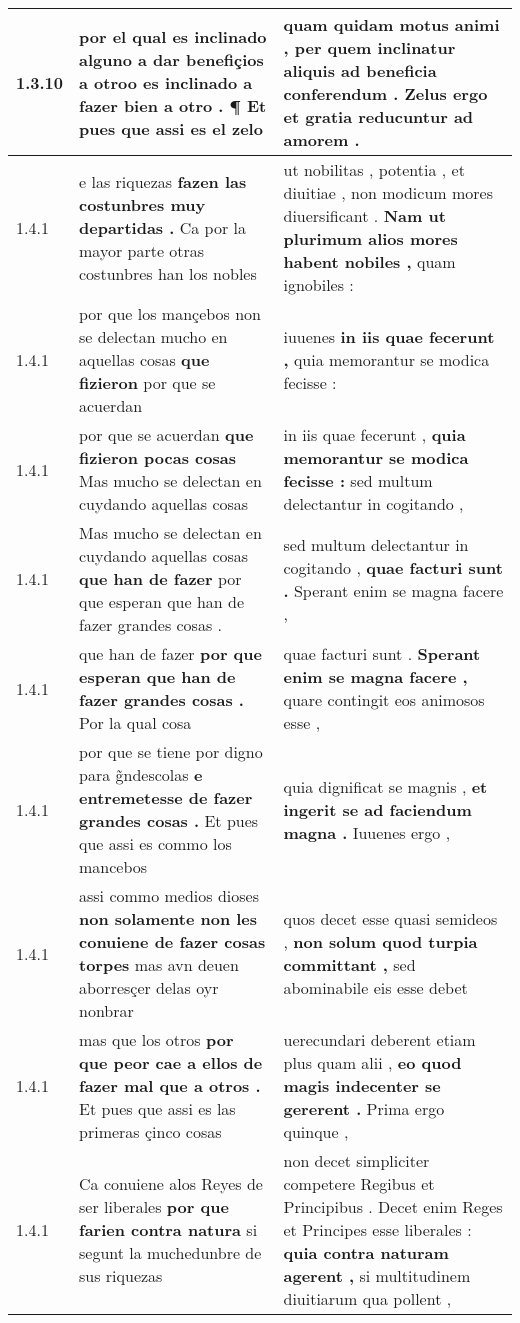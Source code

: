 \begin{tabular}{|p{1cm}|p{6.5cm}|p{6.5cm}|}
1.3.10 & por el qual es inclinado alguno a dar benefiçios a \textbf{ otroo es inclinado a fazer bien a otro . } ¶ Et pues que assi es el zelo & quam quidam motus animi , \textbf{ per quem inclinatur aliquis ad beneficia conferendum . } Zelus ergo et gratia reducuntur ad amorem . \\\hline
1.4.1 & e las riquezas \textbf{ fazen las costunbres muy departidas . } Ca por la mayor parte otras costunbres han los nobles & ut nobilitas , potentia , et diuitiae , non modicum mores diuersificant . \textbf{ Nam ut plurimum alios mores habent nobiles , } quam ignobiles : \\\hline
1.4.1 & por que los mançebos non se delectan mucho en aquellas cosas \textbf{ que fizieron } por que se acuerdan & iuuenes \textbf{ in iis quae fecerunt , } quia memorantur se modica fecisse : \\\hline
1.4.1 & por que se acuerdan \textbf{ que fizieron pocas cosas } Mas mucho se delectan en cuydando aquellas cosas & in iis quae fecerunt , \textbf{ quia memorantur se modica fecisse : } sed multum delectantur in cogitando , \\\hline
1.4.1 & Mas mucho se delectan en cuydando aquellas cosas \textbf{ que han de fazer } por que esperan que han de fazer grandes cosas . & sed multum delectantur in cogitando , \textbf{ quae facturi sunt . } Sperant enim se magna facere , \\\hline
1.4.1 & que han de fazer \textbf{ por que esperan que han de fazer grandes cosas . } Por la qual cosa & quae facturi sunt . \textbf{ Sperant enim se magna facere , } quare contingit eos animosos esse , \\\hline
1.4.1 & por que se tiene por digno para g̃ndescolas \textbf{ e entremetesse de fazer grandes cosas . } Et pues que assi es commo los mancebos & quia dignificat se magnis , \textbf{ et ingerit se ad faciendum magna . } Iuuenes ergo , \\\hline
1.4.1 & assi commo medios dioses \textbf{ non solamente non les conuiene de fazer cosas torpes } mas avn deuen aborresçer delas oyr nonbrar & quos decet esse quasi semideos , \textbf{ non solum quod turpia committant , } sed abominabile eis esse debet \\\hline
1.4.1 & mas que los otros \textbf{ por que peor cae a ellos de fazer mal que a otros . } Et pues que assi es las primeras çinco cosas & uerecundari deberent etiam plus quam alii , \textbf{ eo quod magis indecenter se gererent . } Prima ergo quinque , \\\hline
1.4.1 & Ca conuiene alos Reyes de ser liberales \textbf{ por que farien contra natura } si segunt la muchedunbre de sus riquezas & non decet simpliciter competere Regibus et Principibus . Decet enim Reges et Principes esse liberales : \textbf{ quia contra naturam agerent , } si multitudinem diuitiarum qua pollent , \\\hline

\end{tabular}
